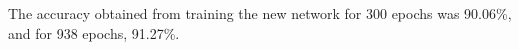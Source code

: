 \documentclass[twoside,twocolumn]{article}
\begin{document}
    The accuracy obtained from training the new network for 300 epochs was 90.06\%, and for 938 epochs, 91.27\%.





\end{document}
